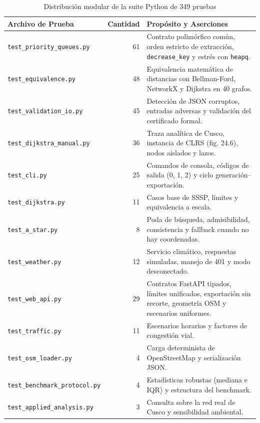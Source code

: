 \begin{table}[H]
    \centering
    \fontsize{9}{11}\selectfont
    \renewcommand{\arraystretch}{1.12}
    \caption{Distribución modular de la suite Python de 349 pruebas}
    \label{tab:suite_pruebas}
    \begin{tabularx}{\textwidth}{@{}>{\raggedright\arraybackslash}p{5.3cm} r >{\raggedright\arraybackslash}X@{}}
        \toprule
        \textbf{Archivo de Prueba} & \textbf{Cantidad} & \textbf{Propósito y Aserciones} \\
        \midrule
        \texttt{test\_priority\_queues.py} & 61 & Contrato polimórfico común, orden estricto de extracción, \texttt{decrease\_key} y estrés con \texttt{heapq}. \\
        \texttt{test\_equivalence.py} & 48 & Equivalencia matemática de distancias con Bellman-Ford, NetworkX y Dijkstra en 40 grafos. \\
        \texttt{test\_validation\_io.py} & 45 & Detección de JSON corruptos, entradas adversas y validación del certificado formal. \\
        \texttt{test\_dijkstra\_manual.py} & 36 & Traza analítica de Cusco, instancia de CLRS (fig. 24.6), nodos aislados y lazos. \\
        \texttt{test\_cli.py} & 25 & Comandos de consola, códigos de salida (0, 1, 2) y ciclo generación--exportación. \\
        \texttt{test\_dijkstra.py} & 11 & Casos base de SSSP, límites y equivalencia a escala. \\
        \texttt{test\_a\_star.py} & 8 & Poda de búsqueda, admisibilidad, consistencia y fallback cuando no hay coordenadas. \\
        \texttt{test\_weather.py} & 12 & Servicio climático, respuestas simuladas, manejo de 401 y modo desconectado. \\
        \texttt{test\_web\_api.py} & 29 & Contratos FastAPI tipados, límites unificados, exportación sin recorte, geometría OSM y escenarios uniformes. \\
        \texttt{test\_traffic.py} & 11 & Escenarios horarios y factores de congestión vial. \\
        \texttt{test\_osm\_loader.py} & 4 & Carga determinista de OpenStreetMap y serialización JSON. \\
        \texttt{test\_benchmark\_protocol.py} & 4 & Estadísticas robustas (mediana e IQR) y estructura del benchmark. \\
        \texttt{test\_applied\_analysis.py} & 3 & Consulta sobre la red real de Cusco y sensibilidad ambiental. \\

\end{tabularx}
\end{table}
